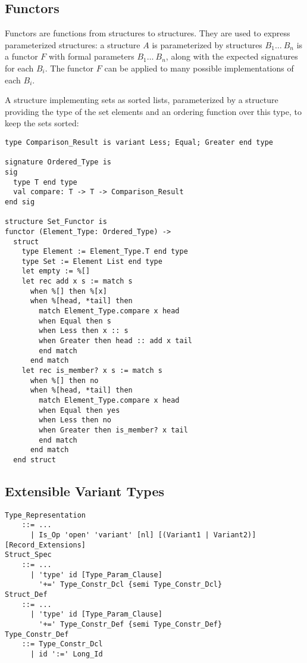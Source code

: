 \subsection{Functors}

Functors are functions from structures to structures. They are used to express parameterized structures: a structure $A$ is parameterized by structures $B_1 \ldots\ B_n$ is a functor $F$ with formal parameters $B_1 \ldots\ B_n$, along with the expected signatures for each $B_i$. The functor $F$ can be applied to many possible implementations of each $B_i$. 

\example A structure implementing sets as sorted lists, parameterized by a structure providing the type of the set elements and an ordering function over this type, to keep the sets sorted:
\begin{lstlisting}
type Comparison_Result is variant Less; Equal; Greater end type

signature Ordered_Type is
sig
  type T end type
  val compare: T -> T -> Comparison_Result
end sig

structure Set_Functor is
functor (Element_Type: Ordered_Type) ->
  struct
    type Element := Element_Type.T end type
    type Set := Element List end type
    let empty := %[]
    let rec add x s := match s
      when %[] then %[x]
      when %[head, *tail] then 
        match Element_Type.compare x head
        when Equal then s
        when Less then x :: s
        when Greater then head :: add x tail
        end match
      end match
    let rec is_member? x s := match s
      when %[] then no
      when %[head, *tail] then 
        match Element_Type.compare x head
        when Equal then yes
        when Less then no
        when Greater then is_member? x tail
        end match
      end match
  end struct
\end{lstlisting}





\subsection{Extensible Variant Types}
\label{sec:extensible-variant-types}

\grammar\begin{lstlisting}
Type_Representation 
    ::= ...
      | Is_Op 'open' 'variant' [nl] [(Variant1 | Variant2)] [Record_Extensions]
Struct_Spec
    ::= ...
      | 'type' id [Type_Param_Clause] 
        '+=' Type_Constr_Dcl {semi Type_Constr_Dcl}
Struct_Def
    ::= ...
      | 'type' id [Type_Param_Clause] 
        '+=' Type_Constr_Def {semi Type_Constr_Def}
Type_Constr_Def
    ::= Type_Constr_Dcl 
      | id ':=' Long_Id
\end{lstlisting}






